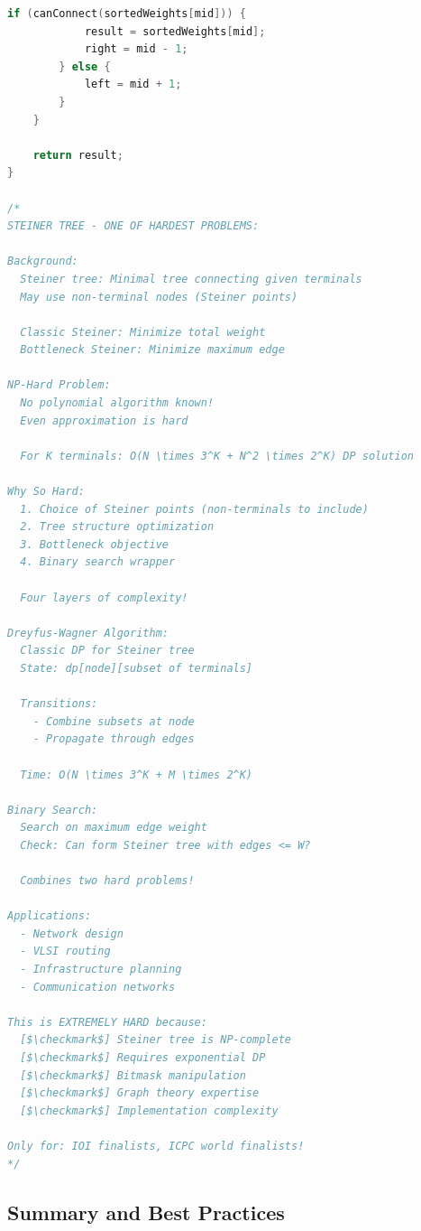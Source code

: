 \documentclass[11pt,a4paper,oneside]{book}
\begin{document}
\begin{lstlisting}[language=C++, caption=ELITE Graph BS Challenges - Complete Solutions]
        if (canConnect(sortedWeights[mid])) {
            result = sortedWeights[mid];
            right = mid - 1;
        } else {
            left = mid + 1;
        }
    }
    
    return result;
}

/*
STEINER TREE - ONE OF HARDEST PROBLEMS:

Background:
  Steiner tree: Minimal tree connecting given terminals
  May use non-terminal nodes (Steiner points)
  
  Classic Steiner: Minimize total weight
  Bottleneck Steiner: Minimize maximum edge

NP-Hard Problem:
  No polynomial algorithm known!
  Even approximation is hard
  
  For K terminals: O(N \times 3^K + N^2 \times 2^K) DP solution

Why So Hard:
  1. Choice of Steiner points (non-terminals to include)
  2. Tree structure optimization
  3. Bottleneck objective
  4. Binary search wrapper
  
  Four layers of complexity!

Dreyfus-Wagner Algorithm:
  Classic DP for Steiner tree
  State: dp[node][subset of terminals]
  
  Transitions:
    - Combine subsets at node
    - Propagate through edges
  
  Time: O(N \times 3^K + M \times 2^K)

Binary Search:
  Search on maximum edge weight
  Check: Can form Steiner tree with edges <= W?
  
  Combines two hard problems!

Applications:
  - Network design
  - VLSI routing
  - Infrastructure planning
  - Communication networks

This is EXTREMELY HARD because:
  [$\checkmark$] Steiner tree is NP-complete
  [$\checkmark$] Requires exponential DP
  [$\checkmark$] Bitmask manipulation
  [$\checkmark$] Graph theory expertise
  [$\checkmark$] Implementation complexity

Only for: IOI finalists, ICPC world finalists!
*/
\end{lstlisting}

\subsection{Summary and Best Practices}
\end{document}
